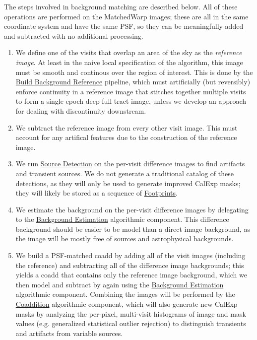The steps involved in background matching are described below.  All of these operations are performed on the MatchedWarp images; these are all in the same coordinate system and have the same PSF, so they can be meaningfully added and subtracted with no additional processing.
\begin{enumerate}
\item We define one of the visits that overlap an area of the sky as the \emph{reference image}.  At least in the naive local specification of the algorithm, this image must be smooth and continous over the region of interest.  This is done by the \hyperref[sec:acBuildBackgroundReference]{Build Background Reference} pipeline, which must artificially (but reversibly) enforce continuity in a reference image that stitches together multiple visits to form a single-epoch-deep full tract image, unless we develop an approach for dealing with discontinuity downstream.
\item We subtract the reference image from every other visit image.  This must account for any artifical features due to the construction of the reference image.
\item We run \hyperref[sec:acSourceDetection]{Source Detection} on the per-visit difference images to find artifacts and transient sources.  We do not generate a traditional catalog of these detections, as they will only be used to generate improved CalExp masks; they will likely be stored as a sequence of \hyperref[sec:spFootprints]{Footprints}.
\item We estimate the background on the per-visit difference images by delegating to the \hyperref[sec:acBackgroundEstimation]{Background Estimation} algorithmic component.  This difference background should be easier to be model than a direct image background, as the image will be mostly free of sources and astrophysical backgrounds.
\item We build a PSF-matched coadd by adding all of the visit images (including the reference) and subtracting all of the difference image backgrounds; this yields a coadd that contains only the reference image background, which we then model and subtract by again using the \hyperref[sec:acBackgroundEstimation]{Background Estimation} algorithmic component.  Combining the images will be performed by the \hyperref[sec:acCoaddition]{Coaddition} algorithmic component, which will also generate new CalExp masks by analyzing the per-pixel, multi-visit histograms of image and mask values (e.g. generalized statistical outlier rejection) to distinguish transients and artifacts from variable sources.
\end{enumerate}

